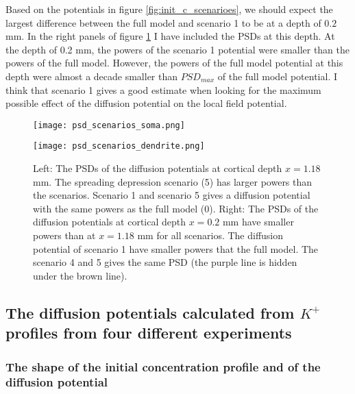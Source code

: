 \documentclass{article}
\begin{document}
Based on the potentials in figure \ref{fig:init_c_scenarioes}, we should expect the largest difference between the full model and scenario 1 to be at a depth of $0.2$ mm. In the right panels of figure \ref{fig:psd_scenarios} I have included the PSDs at this depth. At the depth of 0.2 mm, the powers of the scenario 1 potential were smaller than the powers of the full model. However, the powers of the full model potential at this depth were almost a decade smaller than $PSD_{max}$ of the full model potential. I think that scenario 1 gives a good estimate when looking for the maximum possible effect of the diffusion potential on the local field potential.

\begin{figure}[!tbp]
  \centering
  \begin{minipage}[b]{0.45\textwidth}
    \texttt{[image: psd\_scenarios\_soma.png]}

  \end{minipage}
\hfill
  \begin{minipage}[b]{0.45\textwidth}
    \texttt{[image: psd\_scenarios\_dendrite.png]}

  \end{minipage}

  \caption{Left: The PSDs of the diffusion potentials at cortical depth $x=1.18$ mm. The spreading depression scenario (5) has larger powers than the scenarios. Scenario 1 and scenario 5 gives a diffusion potential with the same powers as the full model (0). 
  Right: The PSDs of the diffusion potentials at cortical depth $x=0.2$ mm have smaller powers than at $x=1.18$ mm for all scenarios. The diffusion potential of scenario 1 have smaller powers that the full model. The scenario 4 and 5 gives the same PSD (the purple line is hidden under the brown line). }
  \label{fig:psd_scenarios}
\end{figure} 

 
\subsection{The diffusion potentials calculated from $K^+$ profiles from four different experiments}\label{diffusion potentials}
\subsubsection{The shape of the initial concentration profile and of the diffusion potential}\label{c(x,t) and phi(x,t)}
\end{document}
